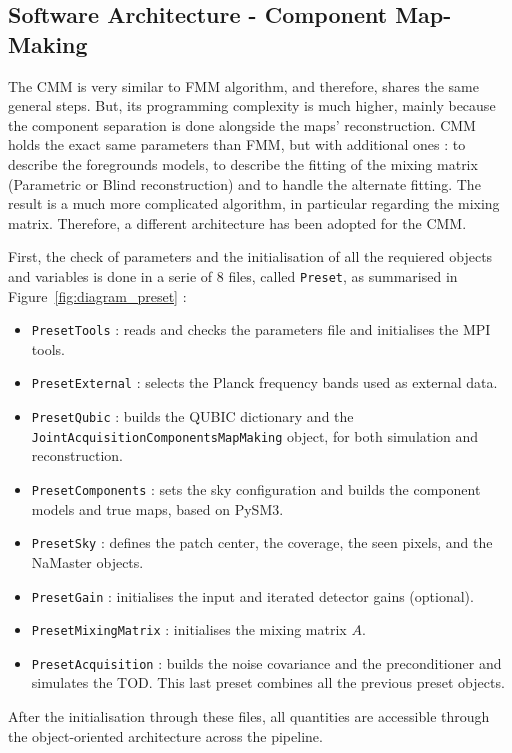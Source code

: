 \documentclass[../../thesis.tex]{subfiles}
\begin{document}
\subsection{Software Architecture - Component Map-Making}

The CMM is very similar to FMM algorithm, and therefore, shares the same general steps. But, its programming complexity is much higher, mainly because the component separation is done alongside the maps' reconstruction. CMM holds the exact same parameters than FMM, but with additional ones : to describe the foregrounds models, to describe the fitting of the mixing matrix (Parametric or Blind reconstruction) and to handle the alternate fitting.
The result is a much more complicated algorithm, in particular regarding the mixing matrix. Therefore, a different architecture has been adopted for the CMM.

First, the check of parameters and the initialisation of all the requiered objects and variables is done in a serie of $8$ files, called \texttt{Preset}, as summarised in Figure~\ref{fig:diagram_preset} :

\begin{itemize}
  \item \texttt{PresetTools} : reads and checks the parameters file and initialises the MPI tools.
  \item \texttt{PresetExternal} : selects the Planck frequency bands used as external data.
  \item \texttt{PresetQubic} : builds the QUBIC dictionary and the \texttt{JointAcquisitionComponentsMapMaking} object, for both simulation and reconstruction.
  \item \texttt{PresetComponents} : sets the sky configuration and builds the component models and true maps, based on PySM3.
  \item \texttt{PresetSky} : defines the patch center, the coverage, the seen pixels, and the NaMaster objects.
  \item \texttt{PresetGain} : initialises the input and iterated detector gains (optional).
  \item \texttt{PresetMixingMatrix} : initialises the mixing matrix $A$.
  \item \texttt{PresetAcquisition} : builds the noise covariance and the preconditioner and simulates the TOD. This last preset combines all the previous preset objects.
\end{itemize}

After the initialisation through these files, all quantities are accessible through the object-oriented architecture across the pipeline.
\end{document}
